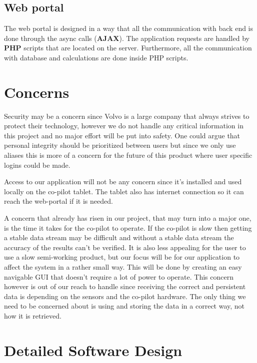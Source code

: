 \documentclass{article}
\begin{document}
\subsection{Web portal}

The web portal is designed in a way that all the communication with back end is done through the async calls (\textbf{AJAX}). The application requests are handled by \textbf{PHP} scripts that are located on the server. Furthermore, all the communication with database and calculations are done inside PHP scripts.

\section{Concerns}

Security may be a concern since Volvo is a large company that always strives to protect their technology, however we do not handle any critical information in this project and no major effort will be put into safety. One could argue that personal integrity should be prioritized between users but since we only use aliases this is more of a concern for the future of this product where user specific logins could be made.  

Access to our application will not be any concern since it’s installed and used locally on the co-pilot tablet. The tablet also has internet connection so it can reach the web-portal if it is needed.

A concern that already has risen in our project, that may turn into a major one, is the time it takes for the co-pilot to operate. If the co-pilot is slow then getting a stable data stream may be difficult and without a stable data stream the accuracy of the results can’t be verified. It is also less appealing for the user to use a slow semi-working product, but our focus will be for our application to affect the system in a rather small way. This will be done by creating an easy navigable GUI that doesn’t require a lot of power to operate. This concern however is out of our reach to handle since receiving the correct and persistent data is depending on the sensors and the co-pilot hardware. The only thing we need to be concerned about is using and storing the data in a correct way, not how it is retrieved.  

\section{Detailed Software Design}
\end{document}
